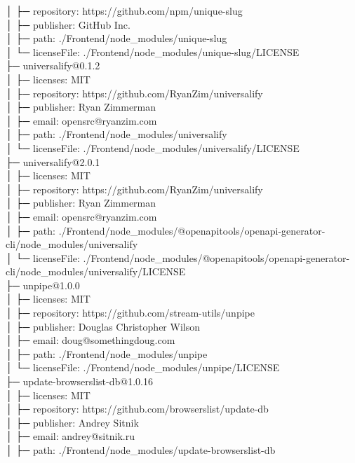 │  ├─ repository: https://github.com/npm/unique-slug\\
│  ├─ publisher: GitHub Inc.\\
│  ├─ path: ./Frontend/node\_modules/unique-slug\\
│  └─ licenseFile: ./Frontend/node\_modules/unique-slug/LICENSE\\
├─ universalify@0.1.2\\
│  ├─ licenses: MIT\\
│  ├─ repository: https://github.com/RyanZim/universalify\\
│  ├─ publisher: Ryan Zimmerman\\
│  ├─ email: opensrc@ryanzim.com\\
│  ├─ path: ./Frontend/node\_modules/universalify\\
│  └─ licenseFile: ./Frontend/node\_modules/universalify/LICENSE\\
├─ universalify@2.0.1\\
│  ├─ licenses: MIT\\
│  ├─ repository: https://github.com/RyanZim/universalify\\
│  ├─ publisher: Ryan Zimmerman\\
│  ├─ email: opensrc@ryanzim.com\\
│  ├─ path: ./Frontend/node\_modules/@openapitools/openapi-generator-cli/node\_modules/universalify\\
│  └─ licenseFile: ./Frontend/node\_modules/@openapitools/openapi-generator-cli/node\_modules/universalify/LICENSE\\
├─ unpipe@1.0.0\\
│  ├─ licenses: MIT\\
│  ├─ repository: https://github.com/stream-utils/unpipe\\
│  ├─ publisher: Douglas Christopher Wilson\\
│  ├─ email: doug@somethingdoug.com\\
│  ├─ path: ./Frontend/node\_modules/unpipe\\
│  └─ licenseFile: ./Frontend/node\_modules/unpipe/LICENSE\\
├─ update-browserslist-db@1.0.16\\
│  ├─ licenses: MIT\\
│  ├─ repository: https://github.com/browserslist/update-db\\
│  ├─ publisher: Andrey Sitnik\\
│  ├─ email: andrey@sitnik.ru\\
│  ├─ path: ./Frontend/node\_modules/update-browserslist-db\\
